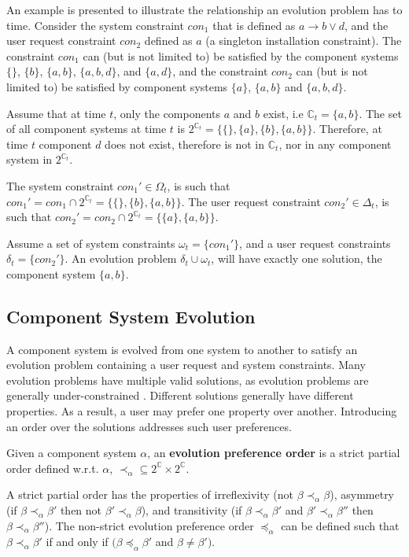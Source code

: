 An example is presented to illustrate the relationship an evolution problem has to time.
Consider the system constraint $con_1$ that is defined as $a \rightarrow b \vee d$, and the user request constraint $con_2$ defined as $a$ (a singleton installation constraint).
The constraint $con_1$ can (but is not limited to) be satisfied by the component systems $\{\}$, $\{b\}$, $\{a,b\}$, $\{a,b,d\}$, and $\{a,d\}$,
and the constraint $con_2$ can (but is not limited to) be satisfied by component systems $\{a\}$, $\{a,b\}$ and $\{a,b,d\}$.

Assume that at time $t$, only the components $a$ and $b$ exist, i.e $\mathbb{C}_{t} = \{a,b\}$.
The set of all component systems at time $t$ is $2^{\mathbb{C}_{t}} = \{\{\},\{a\},\{b\},\{a,b\}\}$.
Therefore, at time $t$ component $d$ does not exist, therefore is not in $\mathbb{C}_{t}$, nor in any component system in $2^{\mathbb{C}_{t}}$.

The system constraint $con_1' \in \Omega_{t}$, is such that $con_1' = con_1 \cap 2^{\mathbb{C}_{t}} = \{\{\},\{b\},\{a,b\}\}$.
The user request constraint $con_2' \in \Delta_{t}$, is such that $con_2' = con_2 \cap 2^{\mathbb{C}_{t}} = \{\{a\},\{a,b\}\}$.

Assume a set of system constraints $\omega_{t} = \{con_1'\}$, and a user request constraints $\delta_{t} = \{con_2'\}$.
An evolution problem $\delta_{t} \cup \omega_{t}$, will have exactly one solution, the component system $\{a,b\}$.  

\subsection{Component System Evolution}
\label{formal.evo}
A component system is evolved from one system to another to satisfy an evolution problem containing a user request and system constraints.
Many evolution problems have multiple valid solutions, as evolution problems are generally under-constrained \citep{Berre2008}.
Different solutions generally have different properties.
As a result, a user may prefer one property over another.
Introducing an order over the solutions addresses such user preferences.  

\begin{defs}
Given a component system $\alpha$, an \textbf{evolution preference order} is a strict partial order defined w.r.t. $\alpha$,  $\prec_{\alpha} \subseteq 2^{\mathbb{C}} \times 2^{\mathbb{C}}$.
\end{defs}
A strict partial order has the properties of irreflexivity (not $\beta \prec_{\alpha} \beta$), asymmetry (if $\beta \prec_{\alpha} \beta'$ then not $\beta' \prec_{\alpha} \beta$), 
and transitivity (if $\beta \prec_{\alpha} \beta'$ and $\beta' \prec_{\alpha} \beta''$ then $\beta \prec_{\alpha} \beta''$).
The non-strict evolution preference order $\preceq_{\alpha}$ can be defined such that $\beta \prec_{\alpha} \beta'$ if and only if $(\beta \preceq_{\alpha} \beta'$ and $\beta \neq \beta')$. 

